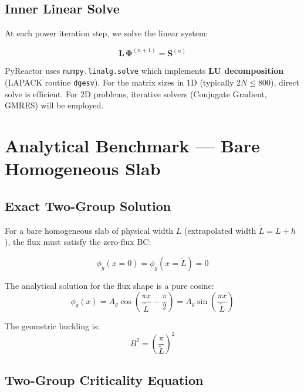 \documentclass[12pt,a4paper]{article}
\newcommand{\flux}[1]{\phi_{#1}}
\begin{document}
\subsection{Inner Linear Solve}

At each power iteration step, we solve the linear system:

\begin{equation}
  \mathbf{L}\,\bm{\Phi}^{(n+1)} = \mathbf{S}^{(n)}
\end{equation}

PyReactor uses \texttt{numpy.linalg.solve} which implements
\textbf{LU decomposition} (LAPACK routine \texttt{dgesv}).
For the matrix sizes in 1D (typically $2N \leq 800$), direct
solve is efficient. For 2D problems, iterative solvers
(Conjugate Gradient, GMRES) will be employed.

\section{Analytical Benchmark — Bare Homogeneous Slab}

\subsection{Exact Two-Group Solution}

For a bare homogeneous slab of physical width $L$ (extrapolated width
$\tilde{L} = L + h$), the flux must satisfy the zero-flux BC:

\begin{equation}
  \flux{g}(x=0) = \flux{g}(x=\tilde{L}) = 0
\end{equation}

The analytical solution for the flux shape is a pure cosine:
\begin{equation}
  \flux{g}(x) = A_g \cos\!\left(\frac{\pi x}{\tilde{L}} - \frac{\pi}{2}\right)
              = A_g \sin\!\left(\frac{\pi x}{\tilde{L}}\right)
\end{equation}

The geometric buckling is:
\begin{equation}
  B^2 = \left(\frac{\pi}{\tilde{L}}\right)^2
\end{equation}

\subsection{Two-Group Criticality Equation}
\end{document}
